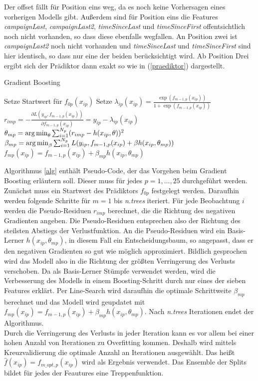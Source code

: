 Der offset fällt für Position eins weg, da es noch keine Vorhersagen eines vorherigen Modells gibt. Außerdem sind für Position eins die Features \textit{campaignLast}, \textit{campaignLast2}, \textit{timeSinceLast} und \textit{timeSinceFirst} offentsichtlich noch nicht vorhanden, so dass diese ebenfalls wegfallen. An Position zwei ist \textit{campaignLast2} noch nicht vorhanden und \textit{timeSinceLast} und \textit{timeSinceFirst} sind hier identisch, so dass nur eine der beiden berücksichtigt wird. Ab Position Drei ergibt sich der Prädiktor dann exakt so wie in (\ref{praediktor}) dargestellt.\\
\begin{algorithm}
\caption{Gradient Boosting}\label{alg}
\label{gradboosting}
\begin{algorithmic}
\STATE Setze Startwert für $f_{0p}(x_{ip})$
	\STATE Setze $\lambda_{ip}(x_{ip}) = \frac{\exp(f_{m-1,p}(x_{ip}))}{1+\exp(f_{m-1,p}(x_{ip}))}$
		\STATE $r_{imp} = - \frac{\partial L(y_{ip},f_{m-1,p}(x_{ip}))}{\partial f_{m-1,p}(x_{ip})} = y_{ip} - \lambda_{ip}(x_{ip})$
	\ENDFOR
	\STATE $\theta_{mp} = \operatorname*{arg\,min}_{\theta} \sum_{i=1}^{N_p} (r_{imp} - h(x_{ip}, \theta))^2$
	\STATE $\beta_{mp} = \operatorname*{arg\,min}_{\beta} \sum_{i=1}^{N_p} L(y_{ip}, f_{m-1,p}(x_{ip}) + \beta h(x_{ip},\theta_{mp}))$
	\STATE $f_{mp}(x_{ip}) = f_{m-1,p}(x_{ip}) + \beta_{mp} h(x_{ip},\theta_{mp})$
\ENDFOR
\end{algorithmic}
\end{algorithm}
Algorithmus \ref{alg} enthält Pseudo-Code, der das Vorgehen beim Gradient Boosting erläutern soll. Dieser muss für jedes $p=1,...,25$ durchgeführt werden. Zunächst muss ein Startwert des Prädiktors $f_{0p}$ festgelegt werden. Daraufhin werden folgende Schritte für $m=1$ bis \textit{n.trees} iteriert. Für jede Beobachtung $i$ werden die Pseudo-Residuen $r_{imp}$ berechnet, die die Richtung des negativen Gradienten angeben. Die Pseudo-Residuen entsprechen also der Richtung des steilsten Abstiegs der Verlustfunktion. An die Pseudo-Residuen wird ein Basis-Lerner $h(x_{ip},\theta_{mp})$, in diesem Fall ein Entscheidungsbaum, so angepasst, dass er den negativen Gradienten so gut wie möglich approximiert. Bildlich gesprochen wird das Modell also in die Richtung der größten Verringerung des Verlusts verschoben. Da als Basis-Lerner Stümpfe verwendet werden, wird die Verbesserung des Modells in einem Boosting-Schritt durch nur eines der sieben Features erklärt. Per Line-Search wird daraufhin die optimale Schrittweite $\beta_{mp}$ berechnet und das Modell wird geupdatet mit $f_{mp}(x_{ip}) = f_{m-1,p}(x_{ip}) + \beta_{mp} h(x_{ip},\theta_{mp})$. Nach \textit{n.trees} Iterationen endet der Algorithmus.\\
Durch die Verringerung des Verlusts in jeder Iteration kann es vor allem bei einer hohen Anzahl von Iterationen zu Overfitting kommen. Deshalb wird mittels Kreuzvalidierung die optimale Anzahl an Iterationen ausgewählt. Das heißt $\hat{f}(x_{ip}) = f_{m\_opt,p}(x_{ip})$ wird als Ergebnis verwendet. Das Ensemble der Splits bildet für jedes der Feautures eine Treppenfunktion.

